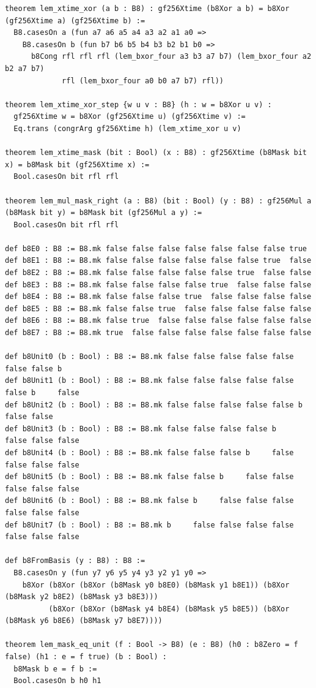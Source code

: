 \documentclass[10pt,twocolumn]{article}
\theoremstyle{spectralthm}
\begin{document}
\begin{lstlisting}[language=Lean4,caption={Standalone Pure Init.Prelude Term-Mode Lean 4 Expansion (thm30--thm37, v1.1.0, 0 sorry, 0 axioms).},label={lst:lean_v110}]
theorem lem_xtime_xor (a b : B8) : gf256Xtime (b8Xor a b) = b8Xor (gf256Xtime a) (gf256Xtime b) :=
  B8.casesOn a (fun a7 a6 a5 a4 a3 a2 a1 a0 =>
    B8.casesOn b (fun b7 b6 b5 b4 b3 b2 b1 b0 =>
      b8Cong rfl rfl rfl (lem_bxor_four a3 b3 a7 b7) (lem_bxor_four a2 b2 a7 b7)
             rfl (lem_bxor_four a0 b0 a7 b7) rfl))

theorem lem_xtime_xor_step {w u v : B8} (h : w = b8Xor u v) :
  gf256Xtime w = b8Xor (gf256Xtime u) (gf256Xtime v) :=
  Eq.trans (congrArg gf256Xtime h) (lem_xtime_xor u v)

theorem lem_xtime_mask (bit : Bool) (x : B8) : gf256Xtime (b8Mask bit x) = b8Mask bit (gf256Xtime x) :=
  Bool.casesOn bit rfl rfl

theorem lem_mul_mask_right (a : B8) (bit : Bool) (y : B8) : gf256Mul a (b8Mask bit y) = b8Mask bit (gf256Mul a y) :=
  Bool.casesOn bit rfl rfl

def b8E0 : B8 := B8.mk false false false false false false false true
def b8E1 : B8 := B8.mk false false false false false false true  false
def b8E2 : B8 := B8.mk false false false false false true  false false
def b8E3 : B8 := B8.mk false false false false true  false false false
def b8E4 : B8 := B8.mk false false false true  false false false false
def b8E5 : B8 := B8.mk false false true  false false false false false
def b8E6 : B8 := B8.mk false true  false false false false false false
def b8E7 : B8 := B8.mk true  false false false false false false false

def b8Unit0 (b : Bool) : B8 := B8.mk false false false false false false false b
def b8Unit1 (b : Bool) : B8 := B8.mk false false false false false false b     false
def b8Unit2 (b : Bool) : B8 := B8.mk false false false false false b     false false
def b8Unit3 (b : Bool) : B8 := B8.mk false false false false b     false false false
def b8Unit4 (b : Bool) : B8 := B8.mk false false false b     false false false false
def b8Unit5 (b : Bool) : B8 := B8.mk false false b     false false false false false
def b8Unit6 (b : Bool) : B8 := B8.mk false b     false false false false false false
def b8Unit7 (b : Bool) : B8 := B8.mk b     false false false false false false false

def b8FromBasis (y : B8) : B8 :=
  B8.casesOn y (fun y7 y6 y5 y4 y3 y2 y1 y0 =>
    b8Xor (b8Xor (b8Xor (b8Mask y0 b8E0) (b8Mask y1 b8E1)) (b8Xor (b8Mask y2 b8E2) (b8Mask y3 b8E3)))
          (b8Xor (b8Xor (b8Mask y4 b8E4) (b8Mask y5 b8E5)) (b8Xor (b8Mask y6 b8E6) (b8Mask y7 b8E7))))

theorem lem_mask_eq_unit (f : Bool -> B8) (e : B8) (h0 : b8Zero = f false) (h1 : e = f true) (b : Bool) :
  b8Mask b e = f b :=
  Bool.casesOn b h0 h1


\end{lstlisting}
\end{document}
